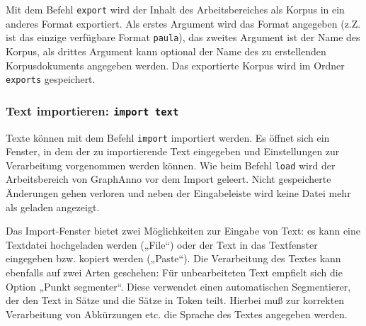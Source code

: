 \documentclass[12pt]{scrartcl}
\begin{document}
Mit dem Befehl \texttt{export} wird der Inhalt des Arbeitsbereiches als Korpus in ein anderes Format exportiert. Als erstes Argument wird das Format angegeben (z.Z. ist das einzige verfügbare Format \texttt{paula}), das zweites Argument ist der Name des Korpus, als drittes Argument kann optional der Name des zu erstellenden Korpusdokuments angegeben werden. Das exportierte Korpus wird im Ordner \texttt{exports} gespeichert.


\subsubsection{Text importieren: \texttt{import text}}

Texte können mit dem Befehl \texttt{import} importiert werden. Es öffnet sich ein Fenster, in dem der zu importierende Text eingegeben und Einstellungen zur Verarbeitung vorgenommen werden können.
Wie beim Befehl \texttt{load} wird der Arbeitsbereich von GraphAnno vor dem Import geleert. Nicht gespeicherte Änderungen gehen verloren und neben der Eingabeleiste wird keine Datei mehr als geladen angezeigt.

Das Import-Fenster bietet zwei Möglichkeiten zur Eingabe von Text: es kann eine Textdatei hochgeladen werden („File“) oder der Text in das Textfenster eingegeben bzw. kopiert werden („Paste“). Die Verarbeitung des Textes kann ebenfalls auf zwei Arten geschehen: Für unbearbeiteten Text empfielt sich die Option „Punkt segmenter“. Diese verwendet einen automatischen Segmentierer, der den Text in Sätze und die Sätze in Token teilt. Hierbei muß zur korrekten Verarbeitung von Abkürzungen etc. die Sprache des Textes angegeben werden.
\end{document}
